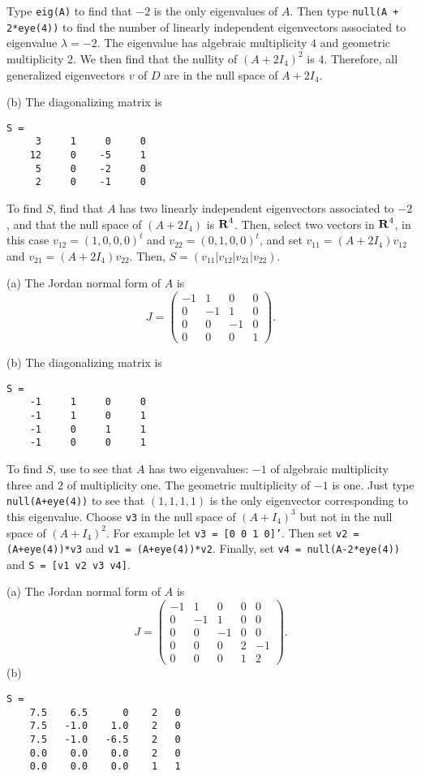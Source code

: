 \soln
Type {\tt eig(A)} to find that $-2$ is the only eigenvalues of $A$.  Then 
type {\tt null(A + 2*eye(4))} to find the number of linearly
independent eigenvectors associated to eigenvalue $\lambda = -2$.  
The eigenvalue has algebraic multiplicity $4$ and geometric multiplicity
$2$.  We then find that the nullity of $(A + 2I_4)^2$ is $4$. 
Therefore, all generalized eigenvectors $v$ of $D$ are in the null space
of $A + 2I_4$.

(b) \ans   The diagonalizing matrix is
\begin{verbatim}
S =
     3     1     0     0
    12     0    -5     1
     5     0    -2     0
     2     0    -1     0
\end{verbatim}

\soln To find $S$, find that $A$ has two linearly independent
eigenvectors associated to $-2$, and that the null space
of $(A + 2I_4)$ is $\mbox{$\bf{R}$}^4$.  Then, select two vectors in $\mbox{$\bf{R}$}^4$, in this
case $v_{12} = (1,0,0,0)^t$ and $v_{22} = (0,1,0,0)^t$, and set
$v_{11} = (A + 2I_4)v_{12}$ and $v_{21} = (A + 2I_4)v_{22}$.  Then,
$S = (v_{11}|v_{12}|v_{21}|v_{22})$.

(a) \ans The Jordan normal form of $A$ is
\[
J = \left(\begin{array}{rrrr}
-1 &  1 &  0 & 0 \\
0  & -1 &  1 & 0 \\
0  &  0 & -1 & 0 \\
0  &  0 &  0 & 1 \end{array}\right).
\]

(b) \ans  The diagonalizing matrix is
\begin{verbatim}
S =
    -1     1     0     0
    -1     1     0     1
    -1     0     1     1
    -1     0     0     1
\end{verbatim}

\soln To find $S$, use \Matlab to see that $A$ has two eigenvalues: $-1$ of
algebraic multiplicity three and $2$ of multiplicity one.  The geometric 
multiplicity of $-1$ is one.  Just type {\tt null(A+eye(4))} to see that 
$(1,1,1,1)$ is the only eigenvector corresponding to this eigenvalue.  Choose 
{\tt v3} in the null space of $(A+I_4)^3$ but not in the null space of 
$(A+I_4)^2$.  For example let {\tt v3 = [0 0 1 0]'}.  Then set 
{\tt v2 = (A+eye(4))*v3} and {\tt v1 = (A+eye(4))*v2}.  Finally, set 
{\tt v4 = null(A-2*eye(4))} and {\tt S = [v1 v2 v3 v4]}.

 (a) \ans The Jordan normal form of $A$ is
\[
J = \left(\begin{array}{rrrrr}
-1 &  1 &  0 & 0 &  0 \\
 0 & -1 &  1 & 0 &  0 \\
 0 &  0 & -1 & 0 &  0 \\
 0 &  0 &  0 & 2 & -1 \\
 0 &  0 &  0 & 1 &  2 \end{array}\right).
\]
(b) \ans
\begin{verbatim}
S =
    7.5    6.5      0    2   0
    7.5   -1.0    1.0    2   0
    7.5   -1.0   -6.5    2   0
    0.0    0.0    0.0    2   0
    0.0    0.0    0.0    1   1
\end{verbatim}


